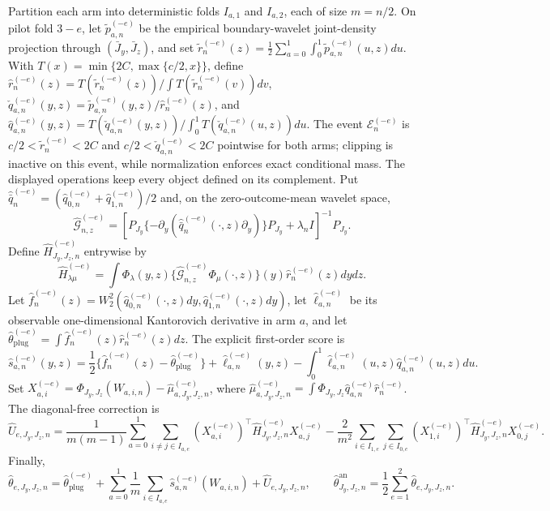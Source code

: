 Partition each arm into deterministic folds \(I_{a,1}\) and \(I_{a,2}\), each of size \(m=n/2\). On pilot fold \(3-e\), let \(\widetilde p_{a,n}^{(-e)}\) be the empirical boundary-wavelet joint-density projection through \((\bar J_y,\bar J_z)\), and set \(\widetilde r_n^{(-e)}(z)=\frac12\sum_{a=0}^1\int_0^1\widetilde p_{a,n}^{(-e)}(u,z)du\). With \(T(x)=\min\{2C,\max\{c/2,x\}\}\), define \(\widehat r_n^{(-e)}(z)=T(\widetilde r_n^{(-e)}(z))/\int T(\widetilde r_n^{(-e)}(v))dv\), \(\check q_{a,n}^{(-e)}(y,z)=\widetilde p_{a,n}^{(-e)}(y,z)/\widehat r_n^{(-e)}(z)\), and \(\widehat q_{a,n}^{(-e)}(y,z)=T(\check q_{a,n}^{(-e)}(y,z))/\int_0^1T(\check q_{a,n}^{(-e)}(u,z))du\). The event \(\mathcal E_n^{(-e)}\) is \(c/2<\widetilde r_n^{(-e)}<2C\) and \(c/2<\check q_{a,n}^{(-e)}<2C\) pointwise for both arms; clipping is inactive on this event, while normalization enforces exact conditional mass. The displayed operations keep every object defined on its complement. Put \(\widehat{\bar q}_n^{(-e)}=(\widehat q_{0,n}^{(-e)}+\widehat q_{1,n}^{(-e)})/2\) and, on the zero-outcome-mean wavelet space, \[\widehat{\mathcal G}_{n,z}^{(-e)}=\left[P_{J_y}\{-\partial_y(\widehat{\bar q}_n^{(-e)}(\cdot,z)\partial_y)\}P_{J_y}+\lambda_n I\right]^{-1}P_{J_y}.\] Define \(\widehat H_{J_y,J_z,n}^{(-e)}\) entrywise by \[\widehat H_{\lambda\mu}^{(-e)}=\int\Phi_\lambda(y,z)\{\widehat{\mathcal G}_{n,z}^{(-e)}\Phi_\mu(\cdot,z)\}(y)\widehat r_n^{(-e)}(z)dydz.\] Let \(\widehat f_n^{(-e)}(z)=W_2^2(\widehat q_{0,n}^{(-e)}(\cdot,z)dy,\widehat q_{1,n}^{(-e)}(\cdot,z)dy)\), let \(\widehat\ell_{a,n}^{(-e)}\) be its observable one-dimensional Kantorovich derivative in arm \(a\), and let \(\widehat\theta_{\mathrm{plug}}^{(-e)}=\int\widehat f_n^{(-e)}(z)\widehat r_n^{(-e)}(z)dz\). The explicit first-order score is \[\widehat s_{a,n}^{(-e)}(y,z)=\frac12\{\widehat f_n^{(-e)}(z)-\widehat\theta_{\mathrm{plug}}^{(-e)}\}+\widehat\ell_{a,n}^{(-e)}(y,z)-\int_0^1\widehat\ell_{a,n}^{(-e)}(u,z)\widehat q_{a,n}^{(-e)}(u,z)du.\] Set \(X_{a,i}^{(-e)}=\Phi_{J_y,J_z}(W_{a,i,n})-\widehat\mu_{a,J_y,J_z,n}^{(-e)}\), where \(\widehat\mu_{a,J_y,J_z,n}^{(-e)}=\int\Phi_{J_y,J_z}\widehat q_{a,n}^{(-e)}\widehat r_n^{(-e)}\). The diagonal-free correction is \[\widehat U_{e,J_y,J_z,n}=\frac{1}{m(m-1)}\sum_{a=0}^1\sum_{i\ne j\in I_{a,e}}(X_{a,i}^{(-e)})^\top\widehat H_{J_y,J_z,n}^{(-e)}X_{a,j}^{(-e)}-\frac{2}{m^2}\sum_{i\in I_{1,e}}\sum_{j\in I_{0,e}}(X_{1,i}^{(-e)})^\top\widehat H_{J_y,J_z,n}^{(-e)}X_{0,j}^{(-e)}.\] Finally, \[\widehat\theta_{e,J_y,J_z,n}=\widehat\theta_{\mathrm{plug}}^{(-e)}+\sum_{a=0}^1\frac1m\sum_{i\in I_{a,e}}\widehat s_{a,n}^{(-e)}(W_{a,i,n})+\widehat U_{e,J_y,J_z,n},\qquad \widehat\theta^{\mathrm{an}}_{J_y,J_z,n}=\frac12\sum_{e=1}^2\widehat\theta_{e,J_y,J_z,n}.\]